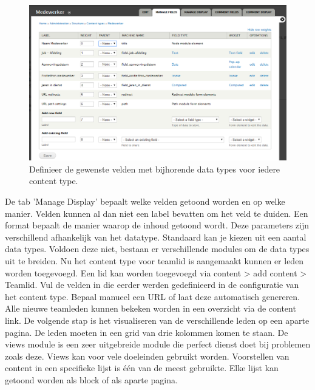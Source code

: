 \begin{figure}[!ht]
  \includegraphics[width=\textwidth]{img/dr-content-type.png}
  \centering
  \caption{Definieer de gewenste velden met bijhorende data types voor iedere content type.}
  \label{fig:Drupal content type.}
\end{figure}

\noindent
De tab 'Manage Display' bepaalt welke velden getoond worden en op welke manier. Velden kunnen al dan niet een label bevatten om het veld te duiden. Een format bepaalt de manier waarop de inhoud getoond wordt. Deze parameters zijn verschillend afhankelijk van het datatype. 
\newline\newline
Standaard kan je kiezen uit een aantal data types. Voldoen deze niet, bestaan er verschillende modules om de data types uit te breiden. 
\newline\newline
Nu het content type voor teamlid is aangemaakt kunnen er leden worden toegevoegd. Een lid kan worden toegevoegd via content > add content > Teamlid. Vul de velden in die eerder werden gedefinieerd in de configuratie van het content type. Bepaal manueel een URL of laat deze automatisch genereren. 
\newline\newline
Alle nieuwe teamleden kunnen bekeken worden in een overzicht via de content link. De volgende stap is het visualiseren van de verschillende leden op een aparte pagina. De leden moeten in een grid van drie kolommen komen te staan. De views module is een zeer uitgebreide module die perfect dienst doet bij problemen zoals deze. Views kan voor vele doeleinden gebruikt worden. Voorstellen van content in een specifieke lijst is één van de meest gebruikte. Elke lijst kan getoond worden als block of als aparte pagina. 

